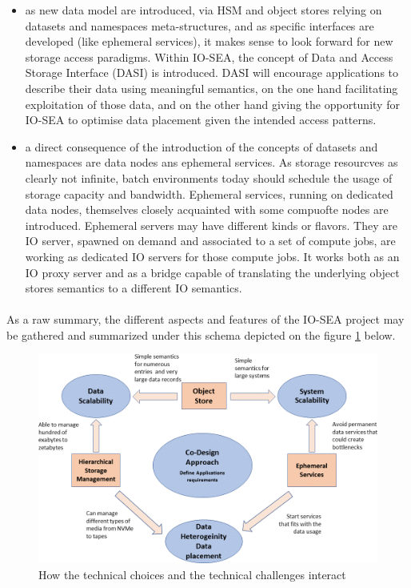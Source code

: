 \begin{itemize}
    \item as new data model are introduced, via HSM and object stores relying on datasets and namespaces 
    meta-structures, and as specific interfaces are developed (like ephemeral services), it makes sense to 
    look forward for new storage access paradigms. Within IO-SEA, the concept of Data and Access Storage 
    Interface (DASI) is introduced.  DASI will encourage applications to describe their data using meaningful semantics, on the one hand facilitating exploitation of those data, and on the other hand giving the opportunity for IO-SEA to optimise data placement given the intended access patterns.
    
    \item a direct consequence of the introduction of the concepts of datasets and namespaces are data nodes ans
    ephemeral services. As storage resourcves as clearly not infinite, batch environments today should schedule the usage of storage capacity and bandwidth. Ephemeral services, running on dedicated data nodes, themselves 
    closely acquainted with some compuofte nodes are introduced. Ephemeral servers may have different kinds or 
    flavors. They are IO server, spawned on demand and associated to a set of compute jobs, are working as
    dedicated IO servers for those compute jobs. It works both as an IO proxy server and as a bridge capable of
    translating the underlying object stores semantics to a different IO semantics. 
\end{itemize}

\paragraph{}
As a raw summary, the different aspects and features of the IO-SEA project may be gathered and
summarized under this schema depicted on the figure \ref{fig:iosea-nutshell} below. 
\begin{figure}[ht]
    \centering
    \includegraphics[width=\textwidth]{FIGS/IOsea.png}
    \caption[IO-SEA in a nutshell]{ How the technical choices and the technical challenges interact}
    \label{fig:iosea-nutshell}
\end{figure}

